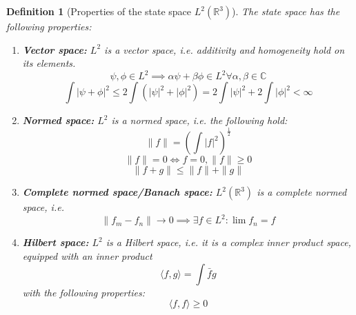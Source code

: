 \documentclass[10pt,a4paper]{report}
\newcommand{\R}{\mathbb{R}}
\newcommand{\C}{\mathbb{C}}
\newtheorem{definition}{Definition}
\begin{document}
\begin{definition}[Properties of the state space $L^2 (\R^3)$]
The state space has the following properties:
    \begin{enumerate}
        \item \textbf{Vector space:} $L^2$ is a vector space, i.e. additivity and homogeneity hold on its elements. 
        \begin{equation}\label{additivity}
            \psi, \phi \in L^2 \implies \alpha \psi + \beta \phi \in L^2 \forall \alpha, \beta \in \C
        \end{equation}
        \begin{equation}\label{homogeneity}
            \int |\psi + \phi|^2 \leq 2 \int \left(|\psi|^2 + |\phi|^2\right) = 2 \int |\psi|^2 + 2 \int |\phi|^2 < \infty
        \end{equation}
        \item \textbf{Normed space:} $L^2$ is a normed space, i.e. the following hold:
        \begin{equation}\label{norm}
            \| f\| = \left(\int |f|^2 \right)^\frac{1}{2}
        \end{equation}
        \begin{equation}\label{zerocondition}
            \| f\| = 0 \iff f = 0, \| f\| \geq 0
        \end{equation}
        \begin{equation}\label{triangle}
            \| f + g\| \leq \| f\| + \| g\|
        \end{equation}
        \item \textbf{Complete normed space/Banach space:} $L^2 (\R^3)$ is a complete normed space, i.e.
        \begin{equation}\label{completenormedspacelimit}
            \| f_m - f_n \| \to 0 \implies \exists f \in L^2 \colon \lim f_n = f
        \end{equation}
        \item \textbf{Hilbert space:}  $L^2$ is a Hilbert space, i.e. it is a complex inner product space, equipped with an inner product
        \begin{equation}\label{innerprod}
            \langle f, g \rangle = \int \bar{f}g
        \end{equation}
        with the following properties:
        \begin{equation}\label{positivity}
            \langle f, f \rangle \geq 0
        \end{equation}
        \begin{equation}\label{zeroconditionhilbert}

\end{equation}
\end{enumerate}
\end{definition}
\end{document}
